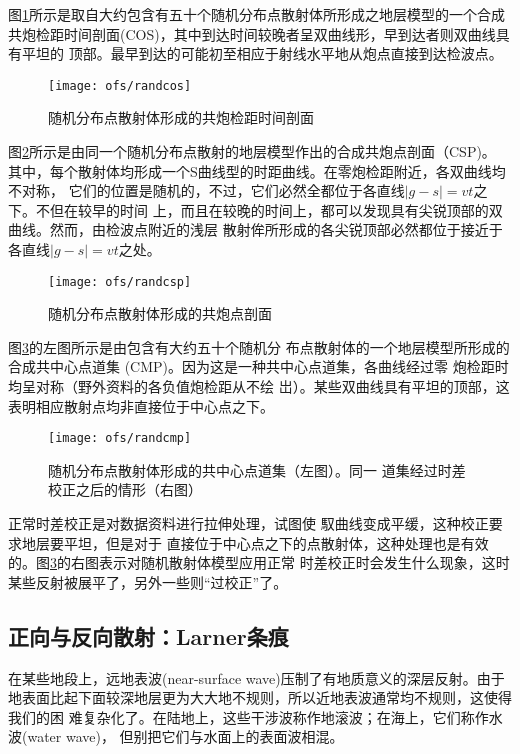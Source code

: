 图\ref{fig:ofs/randcos}所示是取自大约包含有五十个随机分布点散射体所形成之地层模型的一个合成
共炮检距时间剖面(COS)，其中到达时间较晚者呈双曲线形，早到达者则双曲线具有平坦的
顶部。最早到达的可能初至相应于射线水平地从炮点直接到达检波点。
\begin{figure}[H]
\centering
\texttt{[image: ofs/randcos]}
\caption[randcos]{随机分布点散射体形成的共炮检距时间剖面}
\label{fig:ofs/randcos}
\end{figure}

图\ref{fig:ofs/randcsp}所示是由同一个随机分布点散射的地层模型作出的合成共炮点剖面（CSP)。
其中，每个散射体均形成一个S曲线型的时距曲线。在零炮检距附近，各双曲线均不对称，
它们的位置是随机的，不过，它们必然全都位于各直线$\mid g-s\mid=vt$之下。不但在较早的时间
上，而且在较晚的时间上，都可以发现具有尖锐顶部的双曲线。然而，由检波点附近的浅层
散射侔所形成的各尖锐顶部必然都位于接近于各直线$\mid g-s\mid=vt$之处。

\begin{figure}[H]
\centering
\texttt{[image: ofs/randcsp]}
\caption[randcsp]{随机分布点散射体形成的共炮点剖面}
\label{fig:ofs/randcsp}
\end{figure}

图\ref{fig:ofs/randcmp}的左图所示是由包含有大约五十个随机分
布点散射体的一个地层模型所形成的合成共中心点道集
(CMP)。因为这是一种共中心点道集，各曲线经过零
炮检距时均呈对称（野外资料的各负值炮检距从不绘
岀）。某些双曲线具有平坦的顶部，这表明相应散射点均非直接位于中心点之下。

\begin{figure}[H]
\centering
\texttt{[image: ofs/randcmp]}
\caption[randcmp]{随机分布点散射体形成的共中心点道集（左图）。同一
道集经过时差校正之后的情形（右图）}
\label{fig:ofs/randcmp}
\end{figure}

正常时差校正是对数据资料进行拉伸处理，试图使
馭曲线变成平缓，这种校正要求地层要平坦，但是对于
直接位于中心点之下的点散射体，这种处理也是有效
的。图\ref{fig:ofs/randcmp}的右图表示对随机散射体模型应用正常
时差校正时会发生什么现象，这时某些反射被展平了，另外一些则“过校正”了。 

\subsection{正向与反向散射：Larner条痕}
\label{sec:3.2.6}

在某些地段上，远地表波(near-surface wave)压制了有地质意义的深层反射。由于
地表面比起下面较深地层更为大大地不规则，所以近地表波通常均不规则，这使得我们的困
难复杂化了。在陆地上，这些干涉波称作地滚波；在海上，它们称作水波(water wave)，
但别把它们与水面上的表面波相混。

